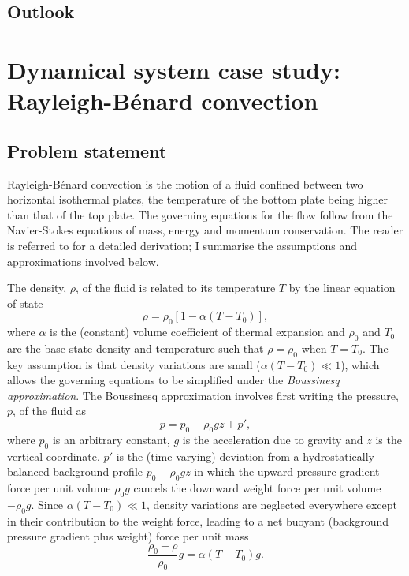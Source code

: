 \documentclass[titlepage,twoside]{article}
\numberwithin{equation}{section}
\newcommand{\rb}{Rayleigh-B\'{e}nard}
\begin{document}
\subsection{Outlook}


\clearpage
\section{Dynamical system case study: \rb{} convection}
\subsection{Problem statement}
\rb{} convection is the motion of a fluid confined between two
horizontal isothermal plates, the temperature of the bottom plate being
higher than that of the top plate. The governing equations for the flow
follow from the Navier-Stokes equations of mass, energy and momentum
conservation. The reader is referred to \textcite{chandrasekhar1961} for
a detailed derivation; I summarise the assumptions and approximations
involved below.

The density, $\rho$, of the fluid is related to its temperature $T$ by
the linear equation of state
\[
    \rho = \rho_0 [1 - \alpha(T - T_0)],
\]
where $\alpha$ is the (constant) volume coefficient of thermal expansion and
$\rho_0$ and $T_0$ are the base-state density and temperature such that $\rho =
\rho_0$ when $T = T_0$. The key assumption is that density variations are small
($\alpha (T - T_0) \ll 1$), which allows the governing equations to be
simplified under the \emph{Boussinesq approximation}. The Boussinesq
approximation involves first writing the pressure, $p$, of the fluid as
\[
    p = p_0 - \rho_0 gz + p',
\]
where $p_0$ is an arbitrary constant, $g$ is the acceleration due to gravity
and $z$ is the vertical coordinate. $p'$ is the (time-varying) deviation from
a hydrostatically balanced background profile $p_0 - \rho_0 gz$
in which the upward pressure gradient force per unit volume $\rho_0 g$ cancels
the downward weight force per unit volume $-\rho_0 g$. Since
$\alpha (T - T_0) \ll 1$, density variations are neglected everywhere except
in their contribution to the weight force, leading to a net buoyant
(background pressure gradient plus weight) force per unit mass
\[
    \frac{\rho_0 - \rho}{\rho_0} g = \alpha (T - T_0) g.
\]
\end{document}
